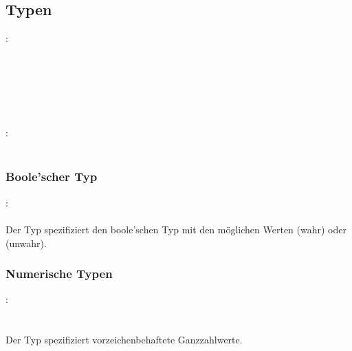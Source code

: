 \subsection{Typen}\label{Typen}
:\label{typ_basis}\\
\hspace*{1cm} \\
\hspace*{1cm} \\
\hspace*{1cm} \\
\hspace*{1cm} \\
\hspace*{1cm} \\
\hspace*{1cm}\\
:\label{typ}\\
\hspace*{1cm} \Gspace{}\\
\subsubsection{Boole'scher Typ}\label{Boole'scher Typ}
:\label{typ_bool}\\
\hspace*{1cm}\\

Der Typ  spezifiziert den boole'schen Typ mit den möglichen Werten
 (wahr) oder  (unwahr).


\subsubsection{Numerische Typen}\label{Numerische Typen}
:\label{typ_num}\\
\hspace*{1cm}\Gspace{}\\
\hspace*{1cm}\\

Der Typ  spezifiziert vorzeichenbehaftete Ganzzahlwerte.

